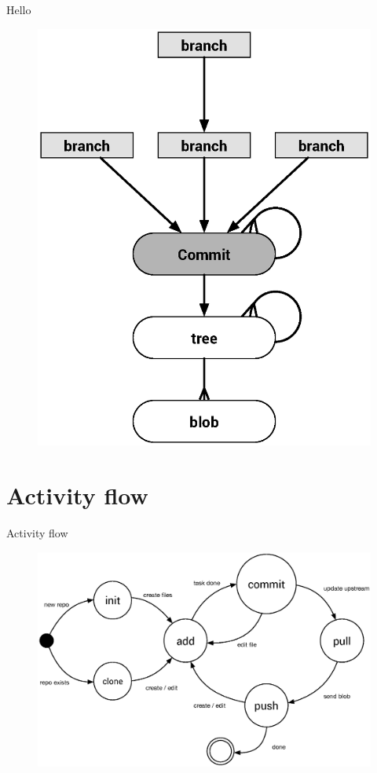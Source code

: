 \documentclass{beamer}
\begin{document}
\begin{frame}{Hello}
    \begin{figure}
        \center
        \includegraphics[height=.8\textheight]{git-action}
        \label{fig:git-action}
    \end{figure}
\end{frame}

\section{Activity flow}
\begin{frame}{Activity flow}
    \begin{figure}
        \center
        \includegraphics[width=.9\textwidth]{git-command-flow}
        \label{fig:git-action}
    \end{figure}
\end{frame}
\end{document}
